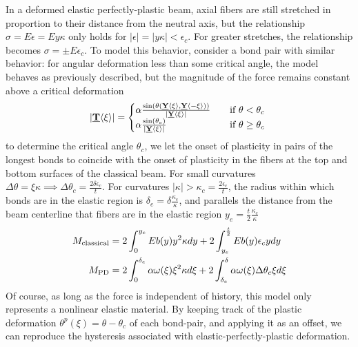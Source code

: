 \documentclass[preprint,review,12pt]{elsarticle}
\newcommand\vstate[3]{%
	\mathbf{\underline{#1}}%
	\ifstrempty{#2}{}{[#2]}%
	\ifstrempty{#3}{}{\langle #3 \rangle}}
\begin{document}
In a deformed elastic perfectly-plastic beam, axial fibers are still stretched in proportion to their distance from the neutral axis, but the relationship \(\sigma = E\epsilon = Ey\kappa\) only holds for \(|\epsilon| = |y\kappa| < \epsilon_c\). 
For greater stretches, the relationship becomes \(\sigma = \pm E\epsilon_c \). 
To model this behavior, consider a bond pair with similar behavior: for angular deformation less than some critical angle, the model behaves as previously described, but the magnitude of the force remains constant above a critical deformation
%
\[ 
|\vstate{T}{}{\xi}| = 
  \begin{cases}
    \alpha \frac{\sin(\theta(\vstate{Y}{}{\xi},\vstate{Y}{}{\mathbf{-\xi}}))}{|\vstate{Y}{}{\xi}|} & \quad \text{if } \theta < \theta_c\\
    \alpha \frac{\sin(\theta_c)}{|\vstate{Y}{}{\xi}|} & \quad \text{if } \theta \geq \theta_c\
  \end{cases}
\]
%
to determine the critical angle \(\theta_c\), we let the onset of plasticity in pairs of the longest bonds to coincide with the onset of plasticity in the fibers at the top and bottom surfaces of the classical beam. 
For small curvatures \(\Delta\theta = \xi\kappa\implies\Delta\theta_c = \frac{2\delta\epsilon_c}{t}\). 
For curvatures \(|\kappa| > \kappa_c=\frac{2\epsilon_c}{t}\), the radius within which bonds are in the elastic region is \(\delta_e = \delta \frac{\kappa_c}{\kappa}\), and parallels the distance from the beam centerline that fibers are in the elastic region \(y_e = \frac{t}{2} \frac{\kappa_c}{\kappa}\)
%
\begin{align}
  M_\text{classical} &= 2 \int_{0}^{y_e}E b(y)y^2 \kappa dy +2 \int_{y_e}^{\frac{t}{2}}E b(y) \epsilon_c y dy\notag \\
  M_\text{PD} &= 2 \int_{0}^{\delta_e}\alpha \omega(\xi) \xi^2 \kappa d\xi +2 \int_{\delta_e}^{\delta}\alpha \omega(\xi) \Delta\theta_c \xi d\xi \notag
\end{align}
%
Of course, as long as the force is independent of history, this model only represents a nonlinear elastic material. 
By keeping track of the plastic deformation \(\theta^p (\xi) = \theta-\theta_c\) of each bond-pair, and applying it as an offset, we can reproduce the hysteresis associated with elastic-perfectly-plastic deformation.
%
%
\end{document}
